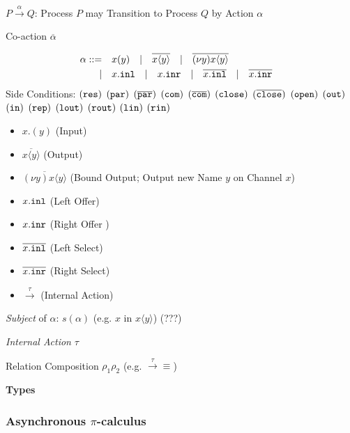 $P \xrightarrow{\alpha} Q$: Process $P$ may Transition to Process $Q$
by Action $\alpha$

Co-action $\overline{\alpha}$

\[
\begin{split}
  \alpha ::=&\quad x(y) \quad
           | \quad \overline{x \langle y \rangle} \quad
           | \quad \overline{(\nu y) x \langle y \rangle} \quad \\
           |&\quad x.\mathtt{inl} \quad
           | \quad x.\mathtt{inr} \quad
           | \quad \overline{x.\mathtt{inl}} \quad
           | \quad \overline{x.\mathtt{inr}} \quad
\end{split}
\]
Side Conditions:
$(\mathtt{res})$
$(\mathtt{par})$
$(\overline{\mathtt{par}})$
$(\mathtt{com})$
$(\overline{\mathtt{com}})$
$(\mathtt{close})$
$(\overline{\mathtt{close}})$
$(\mathtt{open})$
$(\mathtt{out})$
$(\mathtt{in})$
$(\mathtt{rep})$
$(\mathtt{lout})$
$(\mathtt{rout})$
$(\mathtt{lin})$
$(\mathtt{rin})$

\begin{itemize}
  \item $x.(y)$ (Input)
  \item $\overline{x \langle y \rangle}$ (Output)
  \item $\overline{(\nu y) x \langle y \rangle}$ (Bound Output; Output
    new Name $y$ on Channel $x$)
  \item $x.\mathtt{inl}$ (Left Offer)
  \item $x.\mathtt{inr}$ (Right Offer )
  \item $\overline{x.\mathtt{inl}}$ (Left Select)
  \item $\overline{x.\mathtt{inr}}$ (Right Select)
  \item $\xrightarrow{\tau}$ (Internal Action)
\end{itemize}

\emph{Subject} of $\alpha$: $s(\alpha)$ (e.g. $x$ in $x\langle y
\rangle$) (???) \cite{caires-pfenning10}

\emph{Internal Action} $\tau$

Relation Composition $\rho_1 \rho_2$ (e.g. $\xrightarrow{\tau}\equiv$)



\textbf{Types}



\subsubsection{Asynchronous $\pi$-calculus}
\label{sec:asynchronous_pi_calculus}

